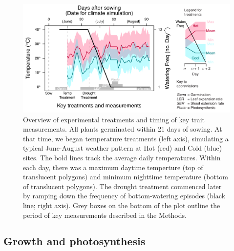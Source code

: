 \documentclass[11pt, oneside]{article}
\begin{document}

\begin{figure}[h!]
	\centerline{\includegraphics[width=1\textwidth]{Figures/Figure_ExptlDes.pdf}}
	\fontsize{10}{12}
	\selectfont
	\caption[Experimental Design]{Overview of experimental treatments and timing of key trait measurements. All plants germinated within 21 days of sowing. At that time, we began temperature treatments (left axis), simulating a typical June-August weather pattern at Hot (red) and Cold (blue) sites. The bold lines track the average daily temperatures. Within each day, there was a maximum daytime temperture (top of translucent polygons) and minimum nighttime temperature (bottom of translucent polygons). The drought treatment commenced later by ramping down the frequency of bottom-watering episodes (black line; right axis). Grey boxes on the bottom of the plot outline the period of key measurements described in the Methods.}
	\label{fig:Fig_ExptlDes}
\end{figure}

\subsection*{Growth and photosynthesis}

\end{document}
